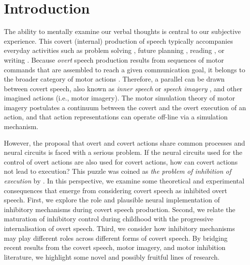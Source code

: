\documentclass[utf8]{template/frontiersSCNS} %
\begin{document}
\newpage

\section{Introduction}

The ability to mentally examine our verbal thoughts is central to our subjective experience. This covert (internal)  production of speech typically accompanies everyday activities such as problem solving \citep{baldo_is_2005, sokolov_inner_1972}, future planning \citep{dargembeau_frequency_2011}, reading \citep[e.g.,][]{loevenbruck_left_2005, perrone-bertolotti_how_2012}, or writing \citep{frith_reading_1979}. Because \textit{overt} speech production results from sequences of motor commands that are assembled to reach a given communication goal, it belongs to the broader category of motor actions \citep{jeannerod_motor_2006}. Therefore, a parallel can be drawn between covert speech, also known as \textit{inner speech} or \textit{speech imagery} \citep[for reviews, see][]{alderson-day_inner_2015, perrone-bertolotti_what_2014, loevenbruck_cognitive_2018}, and other imagined actions (i.e., motor imagery). The motor simulation theory of motor imagery \citep{jeannerod_representing_1994, jeannerod_neural_2001, jeannerod_origin_2006} postulates a continuum between the covert and the overt execution of an action, and that action representations can operate off-line via a simulation mechanism.


However, the proposal that overt and covert actions share common processes and neural circuits is faced with a serious problem. If the neural circuits used for the control of overt actions are also used for covert actions, how can covert actions not lead to execution? This puzzle was coined as \textit{the problem of inhibition of execution} by \cite{jeannerod_neural_2001}. In this perspective, we examine some theoretical and experimental consequences that emerge from considering covert speech as inhibited overt speech. First, we explore the role and plausible neural implementation of inhibitory mechanisms during covert speech production. Second, we relate the maturation of inhibitory control during childhood with the progressive internalisation of overt speech. Third, we consider how inhibitory mechanisms may play different roles across different forms of covert speech. By bridging recent results from the covert speech, motor imagery, and motor inhibition literature, we highlight some novel and possibly fruitful lines of research.
\end{document}

